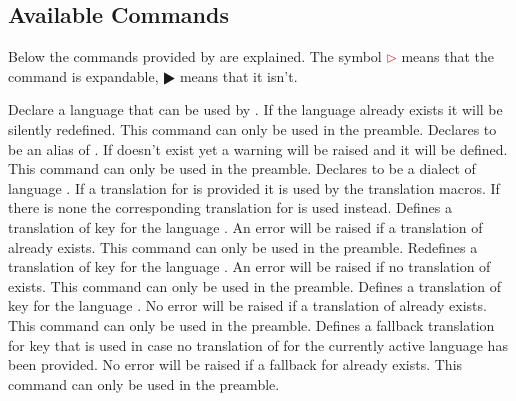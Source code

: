 \documentclass[DIV9,toc=index,toc=bib,numbers=noendperiod]{cnpkgdoc}
\newcommand*\unexpsign{$\RHD$}
\newcommand*\expsign{\textcolor{red}{$\rhd$}}
\begin{document}
\subsection{Available Commands}
Below the commands provided by \translations are explained. The symbol \expsign{}
means that the command is expandable, \unexpsign{} means that it isn't.
\begin{beschreibung}
 \newline
   Declare a language that can be used by \translations. If the language already
   exists it will be silently redefined. This command can only be used in the preamble.
 \newline
   Declares  to be an alias of . If 
   doesn't exist yet a warning will be raised and it will be defined. This command
   can only be used in the preamble.
 \newline
   Declares  to be a dialect of language . If a
   translation for  is provided it is used by the translation
   macros. If there is none the corresponding translation for  is
   used instead.
 \newline
   Defines a translation of key  for the language .
   An error will be raised if a translation of  already exists.
   This command can only be used in the preamble.
 \newline
   Redefines a translation of key  for the language .
   An error will be raised if no translation of  exists.
   This command can only be used in the preamble.
 \newline
   Defines a translation of key  for the language .
   No error will be raised if a translation of  already exists.
   This command can only be used in the preamble.
 \newline
   Defines a fallback translation for key  that is used in case no
   translation of  for the currently active language has been provided.
   No error will be raised if a fallback for  already exists.
   This command can only be used in the preamble.

\end{beschreibung}
\end{document}

